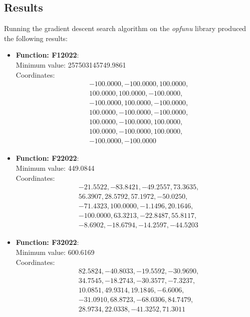 \documentclass{article}
\begin{document}
\subsection{Results}

Running the gradient descent search algorithm on the \textit{opfunu} library
produced the following results:

\begin{itemize}
  \item \textbf{Function: F12022}: \\
    Minimum value: 257503145749.9861 \\
    Coordinates:
    \[
      \begin{aligned}
        & -100.0000, -100.0000, 100.0000, \\
        & 100.0000, 100.0000, -100.0000, \\
        & -100.0000, 100.0000, -100.0000, \\
        & 100.0000, -100.0000, -100.0000, \\
        & 100.0000, -100.0000, 100.0000, \\
        & 100.0000, -100.0000, 100.0000, \\
        & -100.0000, -100.0000
      \end{aligned}
    \]

  \item \textbf{Function: F22022}: \\
    Minimum value: 449.0844 \\
    Coordinates:
    \[
      \begin{aligned}
        & -21.5522, -83.8421, -49.2557, 73.3635, \\
        & 56.3907, 28.5792, 57.1972, -50.0250, \\
        & -71.4323, 100.0000, -1.1496, 20.1646, \\
        & -100.0000, 63.3213, -22.8487, 55.8117, \\
        & -8.6902, -18.6794, -14.2597, -44.5203
      \end{aligned}
    \]

  \item \textbf{Function: F32022}: \\
    Minimum value: 600.6169 \\
    Coordinates:
    \[
      \begin{aligned}
        & 82.5824, -40.8033, -19.5592, -30.9690, \\
        & 34.7545, -18.2743, -30.3577, -7.3237, \\
        & 10.0851, 49.9314, 19.1846, -6.6006, \\
        & -31.0910, 68.8723, -68.0306, 84.7479, \\
        & 28.9734, 22.0338, -41.3252, 71.3011
      \end{aligned}
    \]


\end{itemize}
\end{document}
